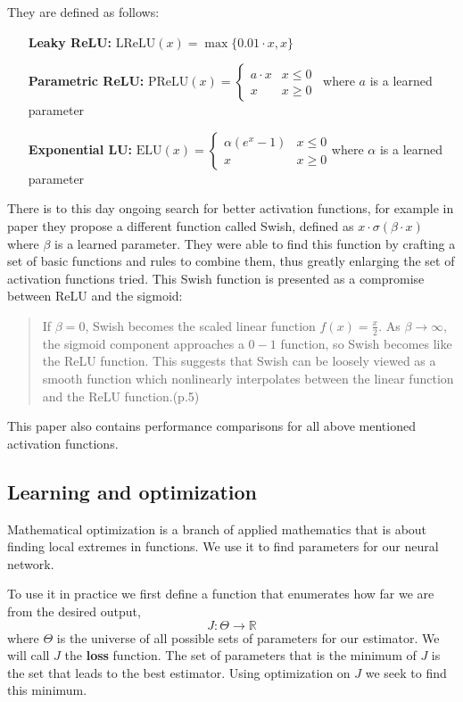They are defined as follows:
\begin{itemize}
\item[\textbf{Leaky ReLU:}] $\text{LReLU}(x)=\max\{0.01\cdot x,x\}$
\item[\textbf{Parametric ReLU:}] $\text{PReLU}(x)=
\begin{cases} 
      a\cdot x & x\leq 0 \\
      x & x\geq 0
   \end{cases}$\ where $a$ is a learned parameter
\item[\textbf{Exponential LU:}] $\text{ELU}(x)=
\begin{cases} 
      \alpha(e^x-1) & x\leq 0 \\
      x & x\geq 0
   \end{cases}
$where $\alpha$ is a learned parameter
\end{itemize}

There is to this day ongoing search for better activation functions, for example in paper \cite{swish} they propose a different function called Swish, defined as $x\cdot \sigma(\beta\cdot x)$ where $\beta$ is a learned parameter. They were able to find this function by crafting a set of basic functions and rules to combine them, thus greatly enlarging the set of activation functions tried. This Swish function is presented as a compromise between ReLU and the sigmoid:
\begin{quote}
If $\beta=0$, Swish becomes the scaled linear function $f(x)=\frac{x}{2}$. As $\beta\rightarrow\infty$,  the sigmoid component approaches a $0-1$ function,  so Swish becomes like the ReLU function. This suggests that Swish can be loosely viewed as a smooth function which nonlinearly interpolates between the linear function and the ReLU function.(p.5)
\end{quote}

This paper also contains performance comparisons for all above mentioned activation functions.

\subsection{Learning and optimization}
Mathematical optimization is a branch of applied mathematics that is about finding local extremes in functions. We use it to find parameters for our neural network.

To use it in practice we first define a function that enumerates how far we are from the desired output, $$J:\Theta\rightarrow\mathbb{R}$$ where $\Theta$ is the universe of all possible sets of parameters for our estimator. We will call $J$ the \textbf{loss} function. The set of parameters that is the minimum of $J$ is the set that leads to the best estimator. Using optimization on $J$ we seek to find this minimum. 

